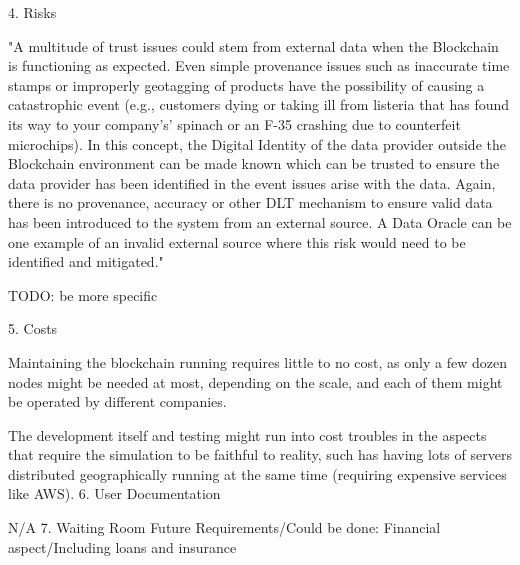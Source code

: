 	4. Risks
		\par "A multitude of trust issues could stem from external data when the Blockchain is functioning as expected. Even simple provenance issues such as inaccurate time stamps or improperly geotagging of products have the possibility of causing a catastrophic event (e.g., customers dying or taking ill from listeria that has found its way to your company's’ spinach or an F-35 crashing due to counterfeit microchips). In this concept, the Digital Identity of the data provider outside the Blockchain environment can be made known which can be trusted to ensure the data provider has been identified in the event issues arise with the data. Again, there is no provenance, accuracy or other DLT mechanism to ensure valid data has been introduced to the system from an external source. A Data Oracle can be one example of an invalid external source where this risk would need to be identified and mitigated."
		\par TODO: be more specific
		
	5. Costs
		\par Maintaining the blockchain running requires little to no cost, as only a few dozen nodes might be needed at most, depending on the scale, and each of them might be operated by different companies.
		\par The development itself and testing might run into cost troubles in the aspects that require the simulation to be faithful to reality, such has having lots of servers distributed geographically running at the same time (requiring expensive services like AWS).
	6. User Documentation
		\par N/A
	7. Waiting Room
Future Requirements/Could be done: Financial aspect/Including loans and insurance